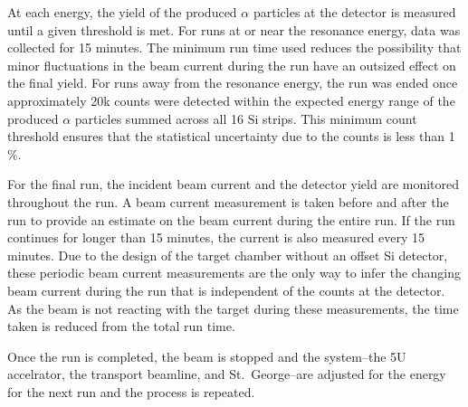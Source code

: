 At each energy, the yield of the produced $\alpha$ particles at the
detector is measured until a given threshold is met. For runs at or near
the resonance energy, data was collected for 15 minutes. The minimum run
time used reduces the possibility that minor fluctuations in the beam
current during the run have an outsized effect on the final yield. For
runs away from the resonance energy, the run was ended once
approximately 20k counts were detected within the expected energy range
of the produced $\alpha$ particles summed across all 16 Si strips. This
minimum count threshold ensures that the statistical uncertainty due to
the counts is less than 1\,\%.

For the final run, the incident beam current and the detector yield are
monitored throughout the run. A beam current measurement is taken before
and after the run to provide an estimate on the beam current during the
entire run. If the run continues for longer than 15 minutes, the current
is also measured every 15 minutes. Due to the design of the target
chamber without an offset Si detector, these periodic beam current
measurements are the only way to infer the changing beam current during
the run that is independent of the counts at the detector. As the beam
is not reacting with the target during these measurements, the time
taken is reduced from the total run time.

Once the run is completed, the beam is stopped and the system\---{}the
5U accelrator, the transport beamline, and St.\ George\---{}are adjusted
for the energy for the next run and the process is repeated.
